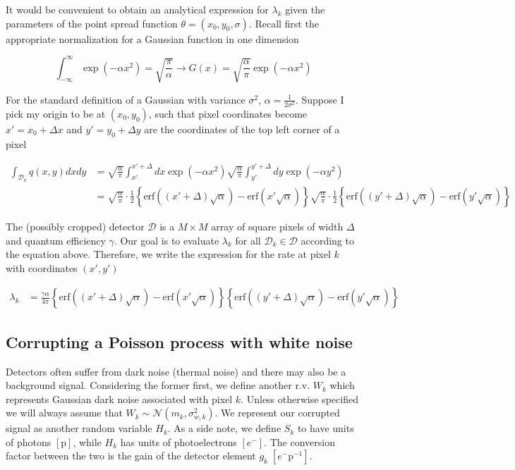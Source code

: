 \documentclass{article}
\begin{document}
It would be convenient to obtain an analytical expression for $\lambda_{k}$ given the parameters of the point spread function $\theta = (x_0,y_0,\sigma)$. Recall first the appropriate normalization for a Gaussian function in one dimension

\begin{equation*}
\int_{-\infty}^{\infty}\exp(-\alpha x^{2}) = \sqrt{\frac{\pi}{\alpha}} \rightarrow G(x) = \sqrt{\frac{\alpha}{\pi}}\exp(-\alpha x^{2})
\end{equation*}


For the standard definition of a Gaussian with variance $\sigma^{2}$, $\alpha = \frac{1}{2\sigma^{2}}$. Suppose I pick my origin to be at $(x_{0},y_{0})$, such that pixel coordinates become $x' = x_{0} + \Delta x$ and $y' = y_{0} + \Delta y$ are the coordinates of the top left corner of a pixel

\begin{align*}
\int_{\mathcal{D}_{k}} q(x,y)dxdy &= \sqrt{\frac{\alpha}{\pi}}\int_{x'}^{x'+\Delta}dx\exp\left(-\alpha x^{2}\right) \sqrt{\frac{\alpha}{\pi}}\int_{y'}^{y' + \Delta}dy\exp\left(-\alpha y^{2}\right)\\
&=\sqrt{\frac{\alpha}{\pi}}\cdot\frac{1}{2}\left\{\mathrm{erf}((x'+\Delta)\sqrt{\alpha})-\mathrm{erf}(x'\sqrt{\alpha})\right\}\sqrt{\frac{\alpha}{\pi}}\cdot\frac{1}{2}\left\{\mathrm{erf}((y'+\Delta)\sqrt{\alpha})-\mathrm{erf}(y'\sqrt{\alpha})\right\}
\end{align*}

The (possibly cropped) detector $\mathcal{D}$ is a $M\times M$ array of square pixels of width $\Delta$ and quantum efficiency $\gamma$. Our goal is to evaluate $\lambda_{k}$ for all $\mathcal{D}_{k} \in \mathcal{D}$ according to the equation above. Therefore, we write the expression for the rate at pixel $k$ with coordinates $(x',y')$

\begin{align*}
\lambda_{k} &= \frac{\gamma\alpha}{4\pi}\left\{\mathrm{erf}((x'+\Delta)\sqrt{\alpha})-\mathrm{erf}(x'\sqrt{\alpha})\right\}\left\{\mathrm{erf}((y'+\Delta)\sqrt{\alpha})-\mathrm{erf}(y'\sqrt{\alpha})\right\}
\end{align*}

\subsection{Corrupting a Poisson process with white noise}

Detectors often suffer from dark noise (thermal noise) and there may also be a background signal. Considering the former first, we define another r.v. $W_{k}$ which represents Gaussian dark noise associated with pixel $k$. Unless otherwise specified we will always assume that $W_{k} \sim \mathcal{N}(m_{k},\sigma_{w,k}^{2})$. We represent our corrupted signal as another random variable $H_{k}$. As a side note, we define $S_{k}$ to have units of photons $[\mathrm{p}]$, while $H_{k}$ has units of photoelectrons $[e^{-}]$. The conversion factor between the two is the gain of the detector element $g_{k}\; [e^{-}\mathrm{p}^{-1}]$.
\end{document}
